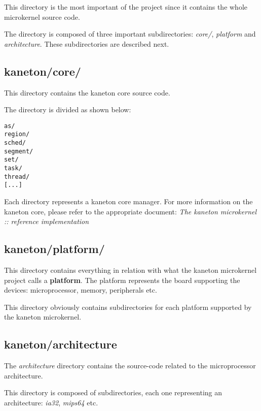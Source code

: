 This directory is the most important of the project since it contains
the whole microkernel source code.

The directory is composed of three important subdirectories: \textit{core/},
\textit{platform} and \textit{architecture}. These subdirectories are described
next.


\subsection*{kaneton/core/}

This directory contains the kaneton core source code.

The directory is divided as shown below:

\begin{verbatim}
as/
region/
sched/
segment/
set/
task/
thread/
[...]
\end{verbatim}

Each directory represents a kaneton core manager. For more information on
the kaneton core, please refer to the appropriate document:
\textit{The kaneton microkernel :: reference implementation}


\subsection*{kaneton/platform/}

This directory contains everything in relation with what the kaneton
microkernel project calls a \textbf{platform}. The platform represents the
board supporting the devices: microprocessor, memory, peripherals etc.

This directory obviously contains subdirectories for each platform
supported by the kaneton microkernel.


\subsection*{kaneton/architecture}

The \textit{architecture} directory contains the source-code related to
the microprocessor architecture.

This directory is composed of subdirectories, each one representing an
architecture: \textit{ia32}, \textit{mips64} etc.


